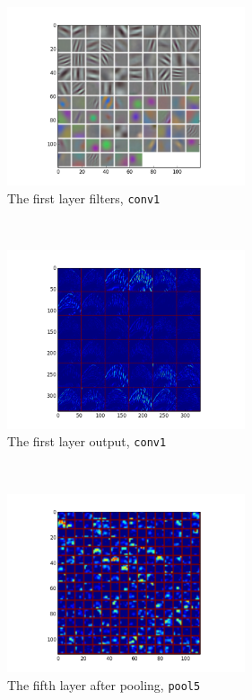 \begin{figure}[htbp]
  \centering
  \begin{subfigure}[t]{0.45\textwidth}
      \centering
      \includegraphics[width=7cm]{preprocess/paramconv1}
      \caption{The first layer filters, \texttt{conv1}}
  \end{subfigure}
  ~\\
  \begin{subfigure}[t]{0.45\textwidth}
      \centering
      \includegraphics[width=7cm]{preprocess/blob20conv1}
      \caption{The first layer output, \texttt{conv1}}
  \end{subfigure}
  ~
  \begin{subfigure}[t]{0.45\textwidth}
      \centering
      \includegraphics[width=7cm]{preprocess/blob20pool5}
      \caption{The fifth layer after pooling, \texttt{pool5}}
  \end{subfigure}
  ~ \\
  \begin{subfigure}[t]{0.45\textwidth}

\end{subfigure}
\end{figure}
